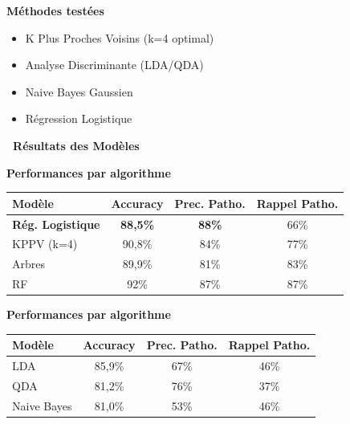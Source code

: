 \documentclass[a0,landscape]{a0poster}
\newcommand{\bigsection}[1]{
  \vspace{0.5cm}
  \begin{tcolorbox}[
    colback=primaryblue,
    coltext=white,
    arc=2mm,
    boxrule=0pt,
    left=10pt,
    right=10pt,
    top=5pt,
    bottom=5pt
  ]
    {\Large\bfseries #1\par}
  \end{tcolorbox}
  \vspace{0.3cm}
}
\begin{document}
\begin{multicols}{3}
\textbf{\color{primaryblue} Méthodes testées}
\begin{minipage}[t]{0.48\linewidth}
  \begin{itemize}
    \item K Plus Proches Voisins (k=4 optimal)
    \item Analyse Discriminante (LDA/QDA)
  \end{itemize}
\end{minipage}%
\hfill
\begin{minipage}[t]{0.48\linewidth}
  \begin{itemize}
    \item Naive Bayes Gaussien
    \item Régression Logistique
  \end{itemize}
\end{minipage}




\bigsection{\faChartLine\ Résultats des Modèles}

\begin{resultbox}
\textbf{\large Performances par algorithme}

\vspace{0.3cm}
\begin{tabular}{@{}l c c c@{}}
\toprule
\textbf{Modèle} & \textbf{Accuracy} & \textbf{Prec. Patho.} & \textbf{Rappel Patho.} \\
\midrule
\textcolor{accentgreen}{\textbf{Rég. Logistique}} & \textcolor{accentgreen}{\textbf{88,5\%}} & \textcolor{accentgreen}{\textbf{88\%}} & 66\% \\
KPPV (k=4) & 90,8\% & 84\% & 77\% \\
Arbres & 89,9\% & 81\% & 83\% \\
RF & 92\% & 87\% & 87\% \\
\bottomrule
\end{tabular}
\end{resultbox}

\begin{criticalbox}
\textbf{\large Performances par algorithme}

\vspace{0.3cm}
\begin{tabular}{@{}l c c c@{}}
\toprule
\textbf{Modèle} & \textbf{Accuracy} & \textbf{Prec. Patho.} & \textbf{Rappel Patho.} \\
\midrule
LDA & 85,9\% & 67\% & 46\% \\
QDA & 81,2\% & 76\% & 37\% \\
Naive Bayes & 81,0\% & 53\% & 46\% \\
\bottomrule
\end{tabular}
\end{criticalbox}


\end{multicols}
\end{document}

